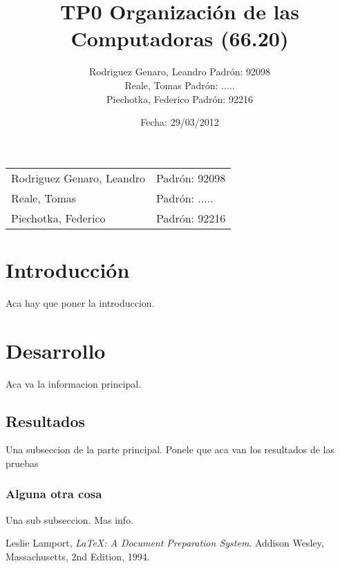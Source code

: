 \documentclass[a4paper,10pt]{report}
\begin{document}
\title{TP0 Organización de las Computadoras (66.20)}
\author{
  Rodriguez Genaro, Leandro	Padrón: 92098\\
  Reale, Tomas			Padrón: .....\\
  Piechotka, Federico		Padrón: 92216}
\date{Fecha: 29/03/2012}

\maketitle

\begin{tabular}{ l l }
  Rodriguez Genaro, Leandro & Padrón: 92098 \\
  Reale, Tomas & Padrón: ..... \\
  Piechotka, Federico & Padrón: 92216 \\
\end{tabular}



\section{Introducción}
Aca hay que poner la introduccion.


\section{Desarrollo}
Aca va la informacion principal.

\subsection{Resultados}
Una subseccion de la parte principal. Ponele que aca van los resultados de las pruebas

\subsubsection{Alguna otra cosa}
Una sub subseccion. Mas info.


\begin{thebibliography}{9}

	  Leslie Lamport,
	  \emph{\LaTeX: A Document Preparation System}.
	  Addison Wesley, Massachusetts,
	  2nd Edition,
	  1994.

\end{thebibliography}
\end{document}
